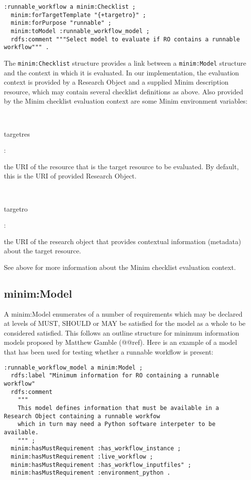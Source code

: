 \documentclass[]{article}
\begin{document}
\begin{verbatim}
:runnable_workflow a minim:Checklist ;
  minim:forTargetTemplate "{+targetro}" ;
  minim:forPurpose "runnable" ;
  minim:toModel :runnable_workflow_model ;
  rdfs:comment """Select model to evaluate if RO contains a runnable workflow""" .
\end{verbatim}

The \texttt{minim:Checklist} structure provides a link between a
\texttt{minim:Model} structure and the context in which it is evaluated.
In our implementation, the evaluation context is provided by a Research
Object and a supplied Minim description resource, which may contain
several checklist definitions as above. Also provided by the Minim
checklist evaluation context are some Minim environment variables:

~~

targetres

:

the URI of the resource that is the target resource to be evaluated. By
default, this is the URI of provided Research Object.

~~

targetro

:

the URI of the research object that provides contextual information
(metadata) about the target resource.

See above for more information about the Minim checklist evaluation
context.

\subsection{minim:Model}

A minim:Model enumerates of a number of requirements which may be
declared at levels of MUST, SHOULD or MAY be satisfied for the model as
a whole to be considered satisfied. This follows an outline structure
for minimum information models proposed by Matthew Gamble (@@ref). Here
is an example of a model that has been used for testing whether a
runnable workflow is present:

\begin{verbatim}
:runnable_workflow_model a minim:Model ;
  rdfs:label "Minimum information for RO containing a runnable workflow"
  rdfs:comment
    """
    This model defines information that must be available in a Research Object containing a runnable workfow
    which in turn may need a Python software interpeter to be available.
    """ ;
  minim:hasMustRequirement :has_workflow_instance ;
  minim:hasMustRequirement :live_workflow ;
  minim:hasMustRequirement :has_workflow_inputfiles" ;
  minim:hasMustRequirement :environment_python .
\end{verbatim}
\end{document}
